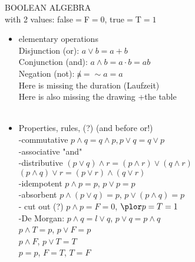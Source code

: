 \documentclass[a4paper, 11pt]{report}
\theoremstyle{break}
\theoremstyle{proofstyle}
\begin{document}
    BOOLEAN ALGEBRA \\
    with 2 values: false$=$F$=0$, true$=$T$=1$
    \begin{itemize}
        \item elementary operations\\
        Disjunction (or): $a\lor b=a+b$ \\
        Conjunction (and): $a\land b=a\cdot b=ab$ \\
        Negation (not): $\not a=\sim a=a$\\
        Here is missing the duration (Laufzeit)\\
        Here is also missing the drawing +the table\\
        \\ 
        \item Properties, rules, (?) (and before or!) \\
        -commutative $p\land q=q\land p, p\lor q=q\lor p$ \\
        -associative "and" \\
        -distributive $(p\lor q)\land r=(p\land r)\lor (q\land r)$ \\
        $(p\land q)\lor r=(p\lor r)\land (q\lor r)$ \\
        -idempotent $p\land p=p$, $p\lor p=p$ \\
        -absorbent $p\land (p\lor q)=p$, $p\lor(p\land q)=p$ \\
        - cut out (?) $p\land p=F=0$, $\plor p=T=1$ \\
        -De Morgan: $p\land q=l\lor q$, $p\lor q=p\land q$ \\
        $p\land T=p$, $p\lor F=p$ \\
        $p\land F$, $p\lor T=T$ \\
        $p=p$, $F=T$, $T=F$ \\
    \end{itemize}\bigskip
    
\end{document}
